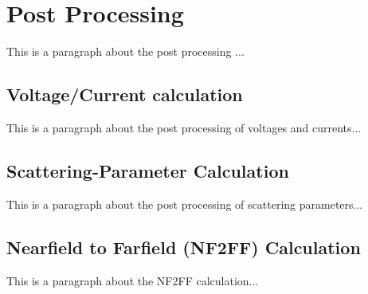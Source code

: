 \chapter{Post Processing}
This is a paragraph about the post processing ...

\section{Voltage/Current calculation}
This is a paragraph about the post processing of voltages and currents...

\section{Scattering-Parameter Calculation}
This is a paragraph about the post processing of scattering parameters...

\section{Nearfield to Farfield (NF2FF) Calculation}
This is a paragraph about the NF2FF calculation...

